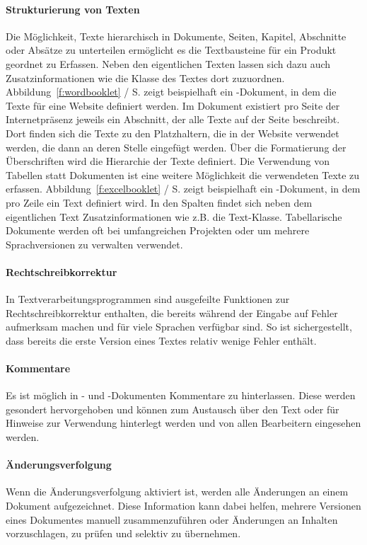 \paragraph{Strukturierung von Texten} Die Möglichkeit, Texte hierarchisch in Dokumente, Seiten, Kapitel, Abschnitte oder Absätze zu unterteilen ermöglicht es die Textbausteine für ein Produkt geordnet zu Erfassen. Neben den eigentlichen Texten lassen sich dazu auch Zusatzinformationen wie die Klasse des Textes dort zuzuordnen. Abbildung~\ref{f:wordbooklet} / S.\pageref{f:wordbooklet} zeigt beispielhaft ein -Dokument, in dem die Texte für eine Website definiert werden. Im Dokument existiert pro Seite der Internetpräsenz jeweils ein Abschnitt, der alle Texte auf der Seite beschreibt. Dort finden sich die Texte zu den Platzhaltern, die in der Website verwendet werden, die dann an deren Stelle eingefügt werden. Über die Formatierung der Überschriften wird die Hierarchie der Texte definiert. Die Verwendung von Tabellen statt Dokumenten ist eine weitere Möglichkeit die verwendeten Texte zu erfassen. Abbildung~\ref{f:excelbooklet} / S.\pageref{f:excelbooklet} zeigt beispielhaft ein -Dokument, in dem pro Zeile ein Text definiert wird. In den Spalten findet sich neben dem eigentlichen Text Zusatzinformationen wie z.B. die Text-Klasse. Tabellarische Dokumente werden oft bei umfangreichen Projekten oder um mehrere Sprachversionen zu verwalten verwendet.

\paragraph{Rechtschreibkorrektur} In Textverarbeitungsprogrammen sind ausgefeilte Funktionen zur Rechtschreibkorrektur enthalten, die bereits während der Eingabe auf Fehler aufmerksam machen und für viele Sprachen verfügbar sind. So ist sichergestellt, dass bereits die erste Version eines Textes relativ wenige Fehler enthält.

\paragraph{Kommentare} Es ist möglich in - und -Dokumenten Kommentare zu hinterlassen. Diese werden gesondert hervorgehoben und können zum Austausch über den Text oder für Hinweise zur Verwendung hinterlegt werden und von allen Bearbeitern eingesehen werden.

\paragraph{Änderungsverfolgung} Wenn die Änderungsverfolgung aktiviert ist, werden alle Änderungen an einem Dokument aufgezeichnet. Diese Information kann dabei helfen, mehrere Versionen eines Dokumentes manuell zusammenzuführen oder Änderungen an Inhalten vorzuschlagen, zu prüfen und selektiv zu übernehmen.

